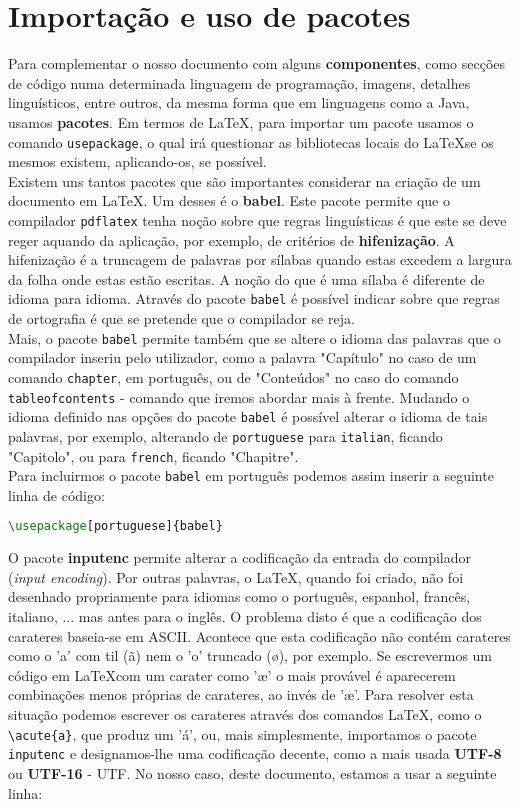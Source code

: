 \documentclass[a4paper, onecolumn, 10pt]{report}
\begin{document}
\section{Importação e uso de pacotes}

Para complementar o nosso documento com alguns \textbf{componentes}, como secções de código numa determinada linguagem de
programação, imagens, detalhes linguísticos, entre outros, da mesma forma que em linguagens como a Java, usamos \textbf{pacotes}.
Em termos de \LaTeX, para importar um pacote usamos o comando \texttt{usepackage}, o qual irá questionar as bibliotecas locais do
\LaTeX se os mesmos existem, aplicando-os, se possível.\\
Existem uns tantos pacotes que são importantes considerar na criação de um documento em \LaTeX. Um desses é o \textbf{babel}. Este
pacote permite que o compilador \texttt{pdflatex} tenha noção sobre que regras linguísticas é que este se deve reger aquando da
aplicação, por exemplo, de critérios de \textbf{hifenização}. A hifenização é a truncagem de palavras por sílabas quando estas
excedem a largura da folha onde estas estão escritas. A noção do que é uma sílaba é diferente de idioma para idioma. Através do
pacote \texttt{babel} é possível indicar sobre que regras de ortografia é que se pretende que o compilador se reja. \\
Mais, o pacote \texttt{babel} permite também que se altere o idioma das palavras que o compilador inseriu pelo utilizador, como a
palavra "Capítulo" no caso de um comando \texttt{chapter}, em português, ou de "Conteúdos" no caso do comando
\texttt{tableofcontents} - comando que iremos abordar mais à frente. Mudando o idioma definido nas opções do pacote \texttt{babel}
é possível alterar o idioma de tais palavras, por exemplo, alterando de \texttt{portuguese} para \texttt{italian}, ficando "Capitolo",
ou para \texttt{french}, ficando "Chapitre". \\
Para incluirmos o pacote \texttt{babel} em português podemos assim inserir a seguinte linha de código:

\begin{lstlisting}[language=TeX]
\usepackage[portuguese]{babel}
\end{lstlisting}

O pacote \textbf{inputenc} permite alterar a codificação da entrada do compilador (\textit{input encoding}). Por outras palavras, o \LaTeX,
quando foi criado, não foi desenhado propriamente para idiomas como o português, espanhol, francês, italiano, ... mas antes para o inglês.
O problema disto é que a codificação dos carateres baseia-se em \ac{ASCII}. Acontece que esta codificação não contém carateres como o 'a' com
til (ã) nem o 'o' truncado (ø), por exemplo. Se escrevermos um código em \LaTeX com um carater como 'æ' o mais provável é aparecerem combinações
menos próprias de carateres, ao invés de 'æ'. Para resolver esta situação podemos escrever os carateres através dos comandos \LaTeX, como o
\texttt{\textbackslash acute\{a\}}, que produz um 'á', ou, mais simplesmente, importamos o pacote \texttt{inputenc} e designamos-lhe
uma codificação decente, como a mais usada \textbf{UTF-8} ou \textbf{UTF-16} - \ac{UTF}. No nosso caso, deste documento, estamos a usar a seguinte linha:
\end{document}
